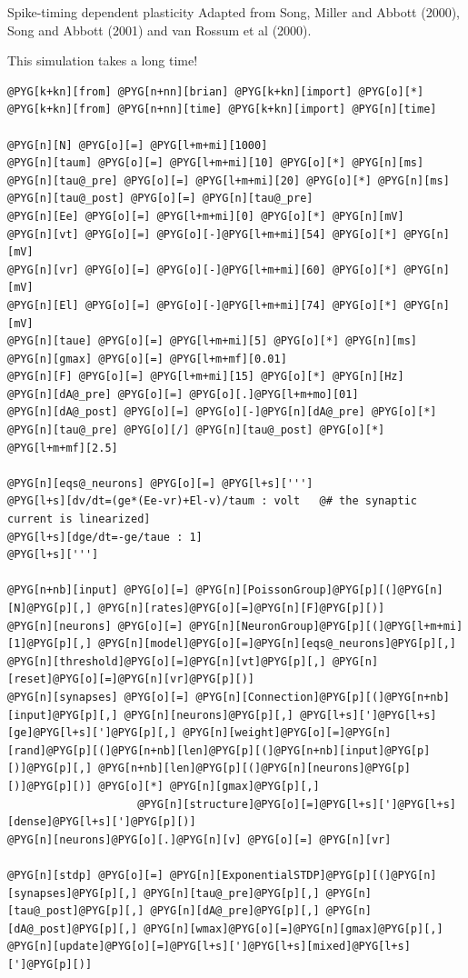 \documentclass[letterpaper,10pt,english]{manual}
\begin{document}
Spike-timing dependent plasticity
Adapted from Song, Miller and Abbott (2000), Song and Abbott (2001)
and van Rossum et al (2000).

This simulation takes a long time!

\begin{Verbatim}[commandchars=@\[\]]
@PYG[k+kn][from] @PYG[n+nn][brian] @PYG[k+kn][import] @PYG[o][*]
@PYG[k+kn][from] @PYG[n+nn][time] @PYG[k+kn][import] @PYG[n][time]

@PYG[n][N] @PYG[o][=] @PYG[l+m+mi][1000]
@PYG[n][taum] @PYG[o][=] @PYG[l+m+mi][10] @PYG[o][*] @PYG[n][ms]
@PYG[n][tau@_pre] @PYG[o][=] @PYG[l+m+mi][20] @PYG[o][*] @PYG[n][ms]
@PYG[n][tau@_post] @PYG[o][=] @PYG[n][tau@_pre]
@PYG[n][Ee] @PYG[o][=] @PYG[l+m+mi][0] @PYG[o][*] @PYG[n][mV]
@PYG[n][vt] @PYG[o][=] @PYG[o][-]@PYG[l+m+mi][54] @PYG[o][*] @PYG[n][mV]
@PYG[n][vr] @PYG[o][=] @PYG[o][-]@PYG[l+m+mi][60] @PYG[o][*] @PYG[n][mV]
@PYG[n][El] @PYG[o][=] @PYG[o][-]@PYG[l+m+mi][74] @PYG[o][*] @PYG[n][mV]
@PYG[n][taue] @PYG[o][=] @PYG[l+m+mi][5] @PYG[o][*] @PYG[n][ms]
@PYG[n][gmax] @PYG[o][=] @PYG[l+m+mf][0.01]
@PYG[n][F] @PYG[o][=] @PYG[l+m+mi][15] @PYG[o][*] @PYG[n][Hz]
@PYG[n][dA@_pre] @PYG[o][=] @PYG[o][.]@PYG[l+m+mo][01]
@PYG[n][dA@_post] @PYG[o][=] @PYG[o][-]@PYG[n][dA@_pre] @PYG[o][*] @PYG[n][tau@_pre] @PYG[o][/] @PYG[n][tau@_post] @PYG[o][*] @PYG[l+m+mf][2.5]

@PYG[n][eqs@_neurons] @PYG[o][=] @PYG[l+s][''']
@PYG[l+s][dv/dt=(ge*(Ee-vr)+El-v)/taum : volt   @# the synaptic current is linearized]
@PYG[l+s][dge/dt=-ge/taue : 1]
@PYG[l+s][''']

@PYG[n+nb][input] @PYG[o][=] @PYG[n][PoissonGroup]@PYG[p][(]@PYG[n][N]@PYG[p][,] @PYG[n][rates]@PYG[o][=]@PYG[n][F]@PYG[p][)]
@PYG[n][neurons] @PYG[o][=] @PYG[n][NeuronGroup]@PYG[p][(]@PYG[l+m+mi][1]@PYG[p][,] @PYG[n][model]@PYG[o][=]@PYG[n][eqs@_neurons]@PYG[p][,] @PYG[n][threshold]@PYG[o][=]@PYG[n][vt]@PYG[p][,] @PYG[n][reset]@PYG[o][=]@PYG[n][vr]@PYG[p][)]
@PYG[n][synapses] @PYG[o][=] @PYG[n][Connection]@PYG[p][(]@PYG[n+nb][input]@PYG[p][,] @PYG[n][neurons]@PYG[p][,] @PYG[l+s][']@PYG[l+s][ge]@PYG[l+s][']@PYG[p][,] @PYG[n][weight]@PYG[o][=]@PYG[n][rand]@PYG[p][(]@PYG[n+nb][len]@PYG[p][(]@PYG[n+nb][input]@PYG[p][)]@PYG[p][,] @PYG[n+nb][len]@PYG[p][(]@PYG[n][neurons]@PYG[p][)]@PYG[p][)] @PYG[o][*] @PYG[n][gmax]@PYG[p][,]
                    @PYG[n][structure]@PYG[o][=]@PYG[l+s][']@PYG[l+s][dense]@PYG[l+s][']@PYG[p][)]
@PYG[n][neurons]@PYG[o][.]@PYG[n][v] @PYG[o][=] @PYG[n][vr]

@PYG[n][stdp] @PYG[o][=] @PYG[n][ExponentialSTDP]@PYG[p][(]@PYG[n][synapses]@PYG[p][,] @PYG[n][tau@_pre]@PYG[p][,] @PYG[n][tau@_post]@PYG[p][,] @PYG[n][dA@_pre]@PYG[p][,] @PYG[n][dA@_post]@PYG[p][,] @PYG[n][wmax]@PYG[o][=]@PYG[n][gmax]@PYG[p][,] @PYG[n][update]@PYG[o][=]@PYG[l+s][']@PYG[l+s][mixed]@PYG[l+s][']@PYG[p][)]


\end{Verbatim}
\end{document}
